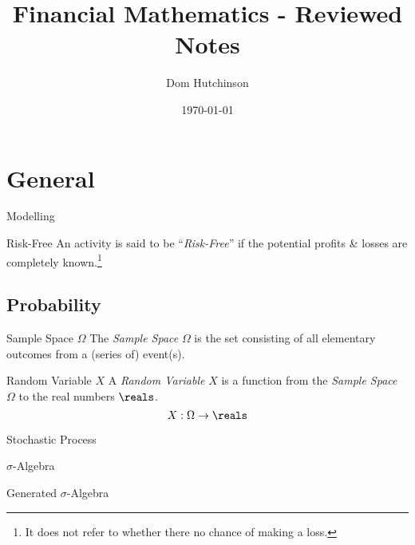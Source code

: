 \documentclass[11pt,a4paper]{article}
\begin{document}
\title{Financial Mathematics - Reviewed Notes}
\author{Dom Hutchinson}
\date{\today}
\maketitle

\tableofcontents\newpage

\section{General}\label{sec_general}

  \begin{definition}{Modelling}

  \end{definition}

  \begin{definition}{Risk-Free}
    An activity is said to be ``\textit{Risk-Free}'' if the potential profits \& losses are completely known.\footnote{It does not refer to whether there no chance of making a loss.}
  \end{definition}

\subsection{Probability}

  \begin{definition}{Sample Space $\Omega$}
    The \textit{Sample Space} $\Omega$ is the set consisting of all elementary outcomes from a (series of) event(s).
  \end{definition}

  \begin{definition}{Random Variable $X$}
    A \textit{Random Variable} $X$ is a function from the \textit{Sample Space} $\Omega$ to the real numbers $\reals$.
    \[ X:\Omega\to\reals \]
  \end{definition}

  \begin{definition}{Stochastic Process}

  \end{definition}

  \begin{definition}{$\sigma$-Algebra}

  \end{definition}

  \begin{definition}{Generated $\sigma$-Algebra}

  \end{definition}
\end{document}
